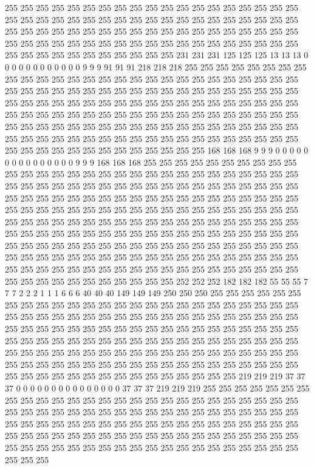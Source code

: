 255 255 255 255 255 255 255 255 255 255 255 255 255 255 255 255 255 255 255 255 255 255 255 255 255 255 255 255 255 255 255 255 255 255 255 255 255 255 255 255 255 255 255 255 255 255 255 255 255 255 255 255 255 255 255 255 255 255 255 255 255 255 255 255 255 255 255 255 255 255 255 255 255 255 255 255 255 255 255 255 255 255 255 255 255 255 255 231 231 231 125 125 125 13 13 13 0 0 0 0 0 0 0 0 0 0 0 0 9 9 9 91 91 91 218 218 218 255 255 255 255 255 255 255 255 255 255 255 
255 255 255 255 255 255 255 255 255 255 255 255 255 255 255 255 255 255 255 255 255 255 255 255 255 255 255 255 255 255 255 255 255 255 255 255 255 255 255 255 255 255 255 255 255 255 255 255 255 255 255 255 255 255 255 255 255 255 255 255 255 255 255 255 255 255 255 255 255 255 255 255 255 255 255 255 255 255 255 255 255 255 255 255 255 255 255 255 255 255 255 255 255 255 255 255 255 255 255 255 255 255 255 255 255 255 255 255 255 255 255 255 255 255 255 255 255 255 255 255 255 255 255 255 168 168 168 9 
9 9 0 0 0 0 0 0 0 0 0 0 0 0 0 0 0 9 9 9 168 168 168 255 255 255 255 255 255 255 255 255 255 255 255 255 255 255 255 255 255 255 255 255 255 255 255 255 255 255 255 255 255 255 255 255 255 255 255 255 255 255 255 255 255 255 255 255 255 255 255 255 255 255 255 255 255 255 255 255 255 255 255 255 255 255 255 255 255 255 255 255 255 255 255 255 255 255 255 255 255 255 255 255 255 255 255 255 255 255 255 255 255 255 255 255 255 255 255 255 255 255 255 255 255 255 255 255 
255 255 255 255 255 255 255 255 255 255 255 255 255 255 255 255 255 255 255 255 255 255 255 255 255 255 255 255 255 255 255 255 255 255 255 255 255 255 255 255 255 255 255 255 255 255 255 255 255 255 255 255 255 255 255 255 255 255 255 255 255 255 255 255 255 255 255 255 255 255 255 255 255 255 255 255 255 255 255 255 255 255 255 255 255 255 255 252 252 252 182 182 182 55 55 55 7 7 7 2 2 2 1 1 1 6 6 6 40 40 40 149 149 149 250 250 250 255 255 255 255 255 255 255 255 255 255 255 
255 255 255 255 255 255 255 255 255 255 255 255 255 255 255 255 255 255 255 255 255 255 255 255 255 255 255 255 255 255 255 255 255 255 255 255 255 255 255 255 255 255 255 255 255 255 255 255 255 255 255 255 255 255 255 255 255 255 255 255 255 255 255 255 255 255 255 255 255 255 255 255 255 255 255 255 255 255 255 255 255 255 255 255 255 255 255 255 255 255 255 255 255 255 255 255 255 255 255 255 255 255 255 255 255 255 255 255 255 255 255 255 255 255 255 255 255 255 255 255 255 255 255 255 219 219 219 37 
37 37 0 0 0 0 0 0 0 0 0 0 0 0 0 0 0 37 37 37 219 219 219 255 255 255 255 255 255 255 255 255 255 255 255 255 255 255 255 255 255 255 255 255 255 255 255 255 255 255 255 255 255 255 255 255 255 255 255 255 255 255 255 255 255 255 255 255 255 255 255 255 255 255 255 255 255 255 255 255 255 255 255 255 255 255 255 255 255 255 255 255 255 255 255 255 255 255 255 255 255 255 255 255 255 255 255 255 255 255 255 255 255 255 255 255 255 255 255 255 255 255 255 255 255 255 255 255 
